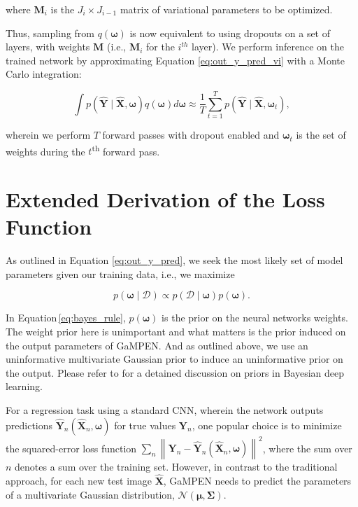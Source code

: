 \documentclass[twocolumn]{aastex63}
\newcommand\gampen{GaMPEN}
\begin{document}
\begin{CJK*}{UTF8}{gbsn}
\noindent
where $\boldsymbol{M}_i$ is the $J_i \times J_{i-1}$ matrix of variational parameters to be optimized. 

Thus, sampling from $q(\boldsymbol{\omega})$ is now equivalent to using dropouts on a set of layers, with weights $\boldsymbol{M}$ %
(i.e., $\boldsymbol{M}_i$ for the $i^{th}$ layer). 
We perform inference on the trained network by 
approximating Equation \ref{eq:out_y_pred_vi} with a Monte Carlo integration: 

\begin{equation}
\int p(\boldsymbol{\hat{Y}} \mid \boldsymbol{\hat{X}}, \boldsymbol{\omega}) q(\boldsymbol{\omega}) d \boldsymbol{\omega} \approx \frac{1}{T} \sum_{t=1}^{T} p(\boldsymbol{\hat{Y}} \mid \boldsymbol{\hat{X}}, \boldsymbol{\omega}_t) ,
\end{equation}

\noindent
wherein we perform $T$ forward passes with dropout enabled and $\boldsymbol{\omega}_t$ is the set of weights during the $t$\textsuperscript{th} forward pass.

\section{Extended Derivation of the Loss Function} \label{sec:ap:final_loss_deri}


As outlined in Equation \ref{eq:out_y_pred}, we seek the most likely set of model parameters given our training data, %
i.e., we maximize 

\begin{equation}
p(\boldsymbol{\omega} \mid \mathcal{D}) \propto p(\mathcal{D} \mid \boldsymbol{\omega})p(\boldsymbol{\omega}) .
\label{eq:bayes_rule}
\end{equation}

In Equation\,\ref{eq:bayes_rule}, $p(\boldsymbol{\omega})$ is the prior on the neural networks weights. The weight prior here is unimportant and what matters is the prior induced on the output parameters of \gampen{}. And as outlined above, we use an uninformative multivariate Gaussian prior to induce an uninformative prior on the output. Please refer to \cite{wilson_20} for a detained discussion on priors in Bayesian deep learning. 

For a regression task using a standard CNN, wherein the network outputs predictions  $\hat{\boldsymbol{Y}}_{n}\left(\boldsymbol{\hat{X}}_{n}, \boldsymbol{\omega}\right)$ for true values $\boldsymbol{Y}_{n}$, one popular choice is to minimize the squared-error loss function $\sum_{n} \left\|\boldsymbol{Y}_n-\boldsymbol{\hat{Y}}_n\left(\boldsymbol{\hat{X}}_n, \boldsymbol{\omega}\right)\right\|^{2}$, where the sum over $n$ denotes a sum over the training set. However, in contrast to the traditional approach, for each new test image $\boldsymbol{\hat{X}}$, \gampen{} needs to predict the parameters of a multivariate Gaussian distribution, $\mathcal{N}(\boldsymbol{\mu}, \boldsymbol{\Sigma})$. 


\end{CJK*}
\end{document}
